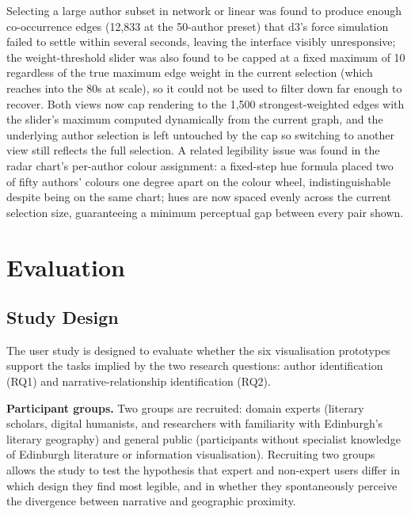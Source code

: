\documentclass[logo,msc]{infthesis}
\begin{document}
Selecting a large author subset in network or linear was found to produce enough co-occurrence edges (12,833 at the 50-author preset) that d3's force simulation failed to settle within several seconds, leaving the interface visibly unresponsive; the weight-threshold slider was also found to be capped at a fixed maximum of 10 regardless of the true maximum edge weight in the current selection (which reaches into the 80s at scale), so it could not be used to filter down far enough to recover. Both views now cap rendering to the 1,500 strongest-weighted edges with the slider's maximum computed dynamically from the current graph, and the underlying author selection is left untouched by the cap so switching to another view still reflects the full selection. A related legibility issue was found in the radar chart's per-author colour assignment: a fixed-step hue formula placed two of fifty authors' colours one degree apart on the colour wheel, indistinguishable despite being on the same chart; hues are now spaced evenly across the current selection size, guaranteeing a minimum perceptual gap between every pair shown.

 
 
\chapter{Evaluation}
\label{chap:eval}
 
\section{Study Design}
 
The user study is designed to evaluate whether the six visualisation prototypes support the tasks implied by the two research questions: author identification (RQ1) and narrative-relationship identification (RQ2).
 
\textbf{Participant groups.} Two groups are recruited: domain experts (literary scholars, digital humanists, and researchers with familiarity with Edinburgh's literary geography) and general public (participants without specialist knowledge of Edinburgh literature or information visualisation). Recruiting two groups allows the study to test the hypothesis that expert and non-expert users differ in which design they find most legible, and in whether they spontaneously perceive the divergence between narrative and geographic proximity.
 
\end{document}
